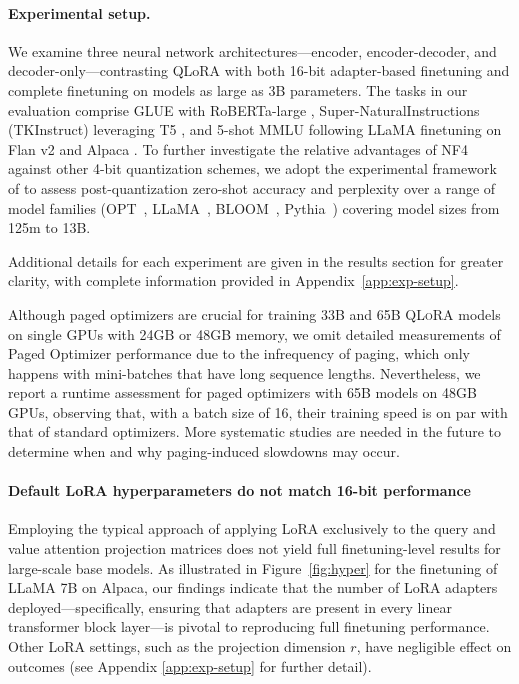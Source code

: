 \paragraph{Experimental setup.} We examine three neural network architectures—encoder, encoder-decoder, and decoder-only—contrasting QLoRA with both 16-bit adapter-based finetuning and complete finetuning on models as large as 3B parameters. The tasks in our evaluation comprise GLUE \citep{wang2018glue} with RoBERTa-large \citep{liu2019roberta}, Super-NaturalInstructions (TKInstruct) \citep{wang2022super} leveraging T5 \citep{t5}, and 5-shot MMLU \citep{hendrycksmeasuring} following LLaMA finetuning on Flan v2 \citep{longpre2023flan} and Alpaca \citep{alpaca}. To further investigate the relative advantages of NF4 against other 4-bit quantization schemes, we adopt the experimental framework of \citet{dettmers2022case} to assess post-quantization zero-shot accuracy and perplexity over a range of model families (OPT~\citep{zhang2022opt}, LLaMA~\citep{touvron2023llama}, BLOOM~\citep{scao2022bloom}, Pythia~\citep{biderman2023pythia}) covering model sizes from 125m to 13B.

Additional details for each experiment are given in the results section for greater clarity, with complete information provided in Appendix~\ref{app:exp-setup}.

Although paged optimizers are crucial for training 33B and 65B \textsc{QLoRA} models on single GPUs with 24GB or 48GB memory, we omit detailed measurements of Paged Optimizer performance due to the infrequency of paging, which only happens with mini-batches that have long sequence lengths. Nevertheless, we report a runtime assessment for paged optimizers with 65B models on 48GB GPUs, observing that, with a batch size of 16, their training speed is on par with that of standard optimizers. More systematic studies are needed in the future to determine when and why paging-induced slowdowns may occur.

\paragraph{Default LoRA hyperparameters do not match 16-bit performance} 

Employing the typical approach of applying LoRA exclusively to the query and value attention projection matrices \citep{hu2021lora} does not yield full finetuning-level results for large-scale base models. As illustrated in Figure~\ref{fig:hyper} for the finetuning of LLaMA 7B on Alpaca, our findings indicate that the number of LoRA adapters deployed—specifically, ensuring that adapters are present in every linear transformer block layer—is pivotal to reproducing full finetuning performance. Other LoRA settings, such as the projection dimension $r$, have negligible effect on outcomes (see Appendix \ref{app:exp-setup} for further detail).

